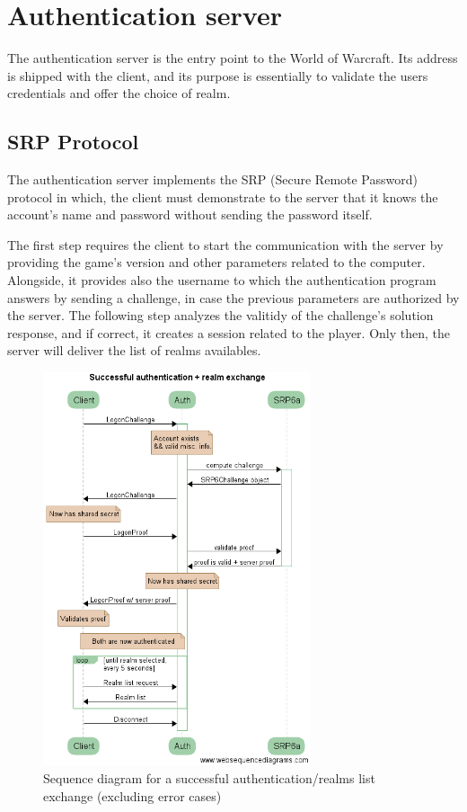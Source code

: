 \documentclass[paper=a4, fontsize=11pt]{scrartcl}
\begin{document}
\section{Authentication server}

The authentication server is the entry point to the World of Warcraft.  
Its address is shipped with the client, and its purpose is essentially to
validate the users credentials and offer the choice of realm.

\subsection{SRP Protocol}
The authentication server implements the SRP (Secure Remote Password) protocol 
in which, the client must demonstrate to the server that it knows the account's 
name and password without sending the password itself.

The first step requires the client to start the communication with the server
by providing the game's version and other parameters related to the computer. 
Alongside, it provides also the username to which the authentication program 
answers by sending a challenge, in case the previous parameters are 
authorized by the server. The following step analyzes the valitidy of the 
challenge's solution response, and if correct, it creates a session related to
the player.
Only then, the server will deliver the list of realms availables.

\begin{figure}[htb!]
    \centering
    \includegraphics[width=0.7\textwidth]{authexch}
    \caption{Sequence diagram for a successful authentication/realms list
    exchange (excluding error cases)}
\end{figure}
\end{document}
